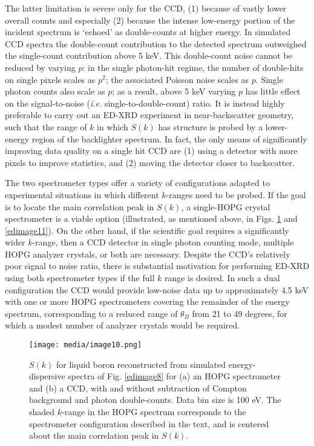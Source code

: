 The latter limitation is severe only for the CCD, (1) because of vastly
lower overall counts and especially (2) because the intense low-energy
portion of the incident spectrum is `echoed' as double-counts at higher
energy. In simulated CCD spectra the double-count contribution to the
detected spectrum outweighed the single-count contribution above 5 keV.
This double-count noise cannot be reduced by varying \(p\): in the
single photon-hit regime, the number of double-hits on single pixels
scales as \(p^{2}\); the associated Poisson noise scales as \(p\).
Single photon counts also scale as \(p\); as a result, above 5 keV
varying \(p\) has little effect on the signal-to-noise (\emph{i.e.}
single-to-double-count) ratio. It is instead highly preferable to carry
out an ED-XRD experiment in near-backscatter geometry, such that the
range of \(k\) in which \(S(k)\) has structure is probed by a
lower-energy region of the backlighter spectrum. In fact, the only means
of significantly improving data quality on a single hit CCD are (1)
using a detector with more pixels to improve statistics, and (2) moving
the detector closer to backscatter.

\FloatBarrier

The two spectrometer types offer a variety of configurations adapted to
experimental situations in which different \(k\)-ranges need to be
probed. If the goal is to locate the main correlation peak in
\(S(k)\)\emph{,} a single-HOPG crystal spectrometer is a viable option
(illustrated, as mentioned above, in Figs. \ref{edimage10} and \ref{edimage11}). On the other
hand, if the scientific goal requires a significantly wider \(k\)-range,
then a CCD detector in single photon counting mode, multiple HOPG
analyzer crystals, or both are necessary. Despite the CCD's relatively
poor signal to noise ratio, there is substantial motivation for
performing ED-XRD using both spectrometer types if the full \(k\) range
is desired. In such a dual configuration the CCD would provide low-noise
data up to approximately 4.5 keV with one or more HOPG spectrometers
covering the remainder of the energy spectrum, corresponding to a
reduced range of \(\theta_{B}\) from 21 to 49 degrees, for which a
modest number of analyzer crystals would be required.

\begin{figure} 
\caption{ \(S(k)\) for liquid boron
reconstructed from simulated energy-dispersive spectra of Fig. \ref{edimage8} for (a)
an HOPG spectrometer and (b) a CCD, with and without subtraction of
Compton background and photon double-counts. Data bin size is 100 eV.
The shaded \(k\)-range in the HOPG spectrum corresponds to the
spectrometer configuration described in the text, and is centered about
the main correlation peak in \(S(k)\).}
\label{edimage10}
\centering
\texttt{[image: media/image10.png]}
\end{figure}


